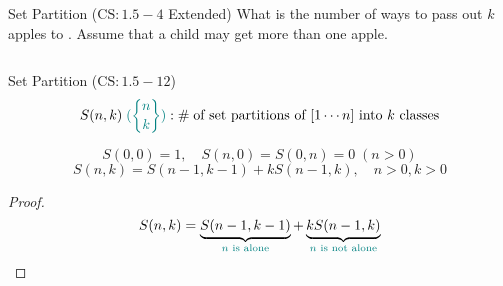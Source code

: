 
\begin{frame}{}
  \begin{exampleblock}{Set Partition ($\text{CS}: 1.5-4$ Extended)}
    What is the number of ways to pass out $k$  apples to . 
    Assume that a child may get more than one apple.
  \end{exampleblock}

  \pause

  \begin{columns}
  \end{columns}

  \pause
  \vspace{0.50cm}
  \centerline{}
\end{frame}

\begin{frame}{}
  \begin{exampleblock}{Set Partition ($\text{CS}: 1.5-12$)}
    \[
      S(n,k) \;\teal{(\stirling{n}{k})}: \#\; \text{of set partitions of $[1 \cdots n]$ into $k$ classes}
    \]
  \end{exampleblock}

  \pause
  \vspace{0.30cm}
  \centerline{}

  \pause
  \vspace{0.30cm}
  \begin{theorem}
    \[
      S(0,0) = 1, \quad S(n,0) = S(0,n) = 0 \; (n > 0)
    \]
    \[
      S(n,k) = S(n-1, k-1) + k S(n-1, k), \quad n > 0, k > 0
    \]
  \end{theorem}

  \pause
  \begin{proof}
    \[
      S(n,k) = \underbrace{S(n-1, k-1)}_{\text{\textcolor{teal}{$n$ is alone}}} + \underbrace{k S(n-1, k)}_{\text{\textcolor{teal}{$n$ is not alone}}}
    \]
  \end{proof}
\end{frame}
